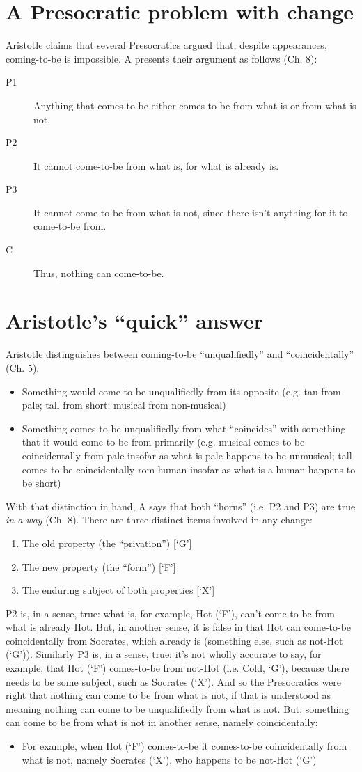 \documentclass[oneside]{article}
\begin{document}
\section*{A Presocratic problem with change}
Aristotle claims that several Presocratics argued that, despite appearances, coming-to-be is impossible. A presents their argument as follows (Ch. 8):
\begin{description}
\item[P1] Anything that comes-to-be either comes-to-be from what is or from what is not.
\item[P2] It cannot come-to-be from what is, for what is already is.
\item[P3] It cannot come-to-be from what is not, since there isn't anything for it to come-to-be from.
\item[C] Thus, nothing can come-to-be.
\end{description}

\section*{Aristotle's ``quick'' answer}
Aristotle distinguishes between coming-to-be ``unqualifiedly'' and ``coincidentally'' (Ch. 5).
\begin{itemize}
\item{Something would come-to-be unqualifiedly from its opposite (e.g. tan from pale; tall from short; musical from non-musical)}
\item{Something comes-to-be unqualifiedly from what ``coincides'' with something that it would come-to-be from primarily (e.g. musical comes-to-be coincidentally from pale insofar as what is pale happens to be unmusical; tall comes-to-be coincidentally rom human insofar as what is a human happens to be short)}
\end{itemize}

With that distinction in hand, A says that both ``horns'' (i.e. P2 and P3) are true \emph{in a way} (Ch. 8). There are three distinct items involved in any change:

\begin{enumerate}
\item The old property (the ``privation'') [`G']
\item The new property (the ``form'') [`F']
\item The enduring subject of both properties [`X']
\end{enumerate}

P2 is, in a sense, true: what is, for example, Hot (`F'), can't come-to-be from what is already Hot. But, in another sense, it is false in that Hot can come-to-be coincidentally from Socrates, which already is (something else, such as not-Hot (`G')).  Similarly P3 is, in a sense, true: it's not wholly accurate to say, for example, that Hot (`F') comes-to-be from not-Hot (i.e. Cold, `G'), because there needs to be some subject, such as Socrates (`X'). And so the Presocratics were right that nothing can come to be from what is not, if that is understood as meaning nothing can come to be unqualifiedly from what is not. But, something can come to be from what is not in another sense, namely coincidentally:

\begin{itemize}
\item For example, when Hot (`F') comes-to-be it comes-to-be coincidentally from what is not, namely Socrates (`X'), who happens to be not-Hot (`G')
\end{itemize}
\end{document}
